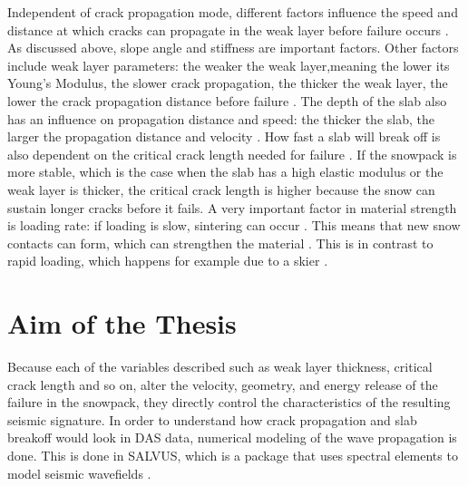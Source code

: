 Independent of crack propagation mode, different factors influence the speed and distance at which cracks can propagate in the weak layer before failure occurs \parencite{gaumeDynamicAnticrackPropagation2018,gaumeSnowFractureRelation2017a,gaumeModelingCrackPropagation2015}. As discussed above, slope angle and stiffness are important factors. Other factors include weak layer parameters: the weaker the weak layer,meaning the lower its Young's Modulus, the slower crack propagation, the thicker the weak layer, the lower the crack propagation distance before failure \parencite{gaumeModelingCrackPropagation2015}. The depth of the slab also has an influence on propagation distance and speed: the thicker the slab, the larger the propagation distance and velocity \parencite{gaumeModelingCrackPropagation2015}. How fast a slab will break off is also dependent on the critical crack length needed for failure \parencite{gaumeSnowFractureRelation2017a}. If the snowpack is more stable, which is the case when the slab has a high elastic modulus or the weak layer is thicker, the critical crack length is higher \parencite{gaumeSnowFractureRelation2017a} because the snow can sustain longer cracks before it fails. A very important factor in material strength is loading rate: if loading is slow, sintering can occur \parencite{mulakNumericalInvestigationMixedmode2019}. This means that new snow contacts can form, which can strengthen the material \parencite{mulakNumericalInvestigationMixedmode2019}. This is in contrast to rapid loading, which happens for example due to a skier \parencite{mulakNumericalInvestigationMixedmode2019}. \par

\section{Aim of the Thesis}
Because each of the variables described such as weak layer thickness, critical crack length and so on, alter the velocity, geometry, and energy release of the failure in the snowpack, they directly control the characteristics of the resulting seismic signature. In order to understand how crack propagation and slab breakoff would look in DAS data, numerical modeling of the wave propagation is done. This is done in SALVUS, which is a package that uses spectral elements to model seismic wavefields \parencite{afanasievSalvusFlexibleHighperformance2017}. \par


